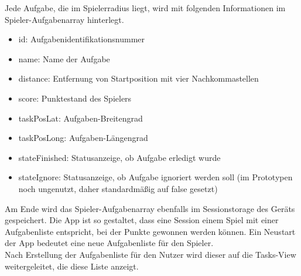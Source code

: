Jede Aufgabe, die im Spielerradius liegt, wird mit folgenden Informationen im Spieler-Aufgabenarray hinterlegt.
\begin{itemize}
\item id: Aufgabenidentifikationsnummer
\item name: Name der Aufgabe
\item distance: Entfernung von Startposition mit vier Nachkommastellen
\item score: Punktestand des Spielers
\item taskPosLat: Aufgaben-Breitengrad
\item taskPosLong: Aufgaben-Längengrad
\item stateFinished: Statusanzeige, ob Aufgabe erledigt wurde
\item stateIgnore: Statusanzeige, ob Aufgabe ignoriert werden soll (im Prototypen noch ungenutzt, daher standardmäßig auf false gesetzt)
\end{itemize}
Am Ende wird das Spieler-Aufgabenarray ebenfalls im Sessionstorage des Geräts gespeichert. Die App ist so gestaltet, dass eine Session einem Spiel mit einer Aufgabenliste entspricht, bei der Punkte gewonnen werden können. Ein Neustart der App bedeutet eine neue Aufgabenliste für den Spieler.
\\
Nach Erstellung der Aufgabenliste für den Nutzer wird dieser auf die Tasks-View weitergeleitet, die diese Liste anzeigt.
